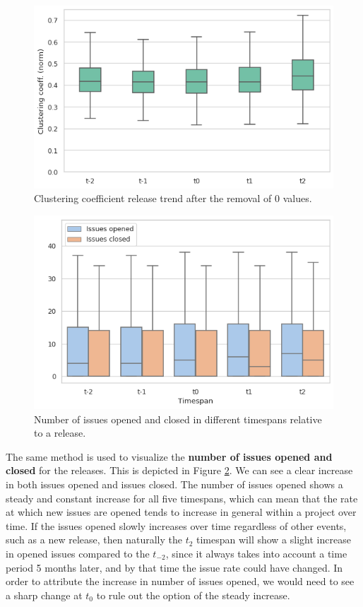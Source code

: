 \begin{figure}
    \centering
    \includegraphics[width=\textwidth]{figures/quantitative/boxplots/clustering.png}
    \caption{Clustering coefficient release trend after the removal of 0 values.}
    \label{fig:clustering-box}
\end{figure}

\begin{figure}
    \centering
    \includegraphics[width=\textwidth]{figures/quantitative/boxplots/issues.png}
    \caption{Number of issues opened and closed in different timespans relative to a release.}
    \label{fig:issues-box}
\end{figure}

The same method is used to visualize the \textbf{number of issues opened and closed} for the releases. This is depicted in Figure \ref{fig:issues-box}. We can see a clear increase in both issues opened and issues closed. The number of issues opened shows a steady and constant increase  for all five timespans, which can mean that the rate at which new issues are opened tends to increase in general within a project over time. If the issues opened slowly increases over time regardless of other events, such as a new release, then naturally the $t_2$ timespan will show a slight increase in opened issues compared to the $t_{-2}$, since it always takes into account a time period 5 months later, and by that time the issue rate could have changed. In order to attribute the increase in number of issues opened, we would need to see a sharp change at $t_0$ to rule out the option of the steady increase.


